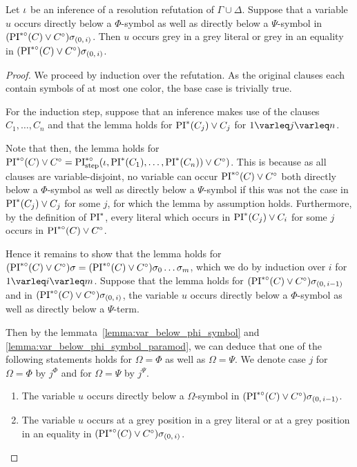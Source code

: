 \documentclass[,%
	draft=false,%
	numbers=noendperiod
	12pt,
	a4paper,
	oneside,%
	openany,
]{memoir}
\newcommand{\inv}{\ensuremath{\PIstarnosigma(C)\lor C\nosigma}}
\newcommand{\invp}{\ensuremath{(\inv)}}
\begin{document}
\begin{lemma}
	\label{lemma:col_change}
	Let $\iota$ be an inference of a resolution refutation of $\Gamma \cup \Delta$.
	Suppose that a variable $u$ occurs directly below a $\Phi$-symbol as well as directly below a $\Psi$-symbol in $\invp\sigmazi$.
	Then $u$ occurs grey in a grey literal or grey in an equality in $\invp\sigmazi$.
\end{lemma}
\begin{proof}
	We proceed by induction over the refutation.
	As the original clauses each contain symbols of at most one color, the base case is trivially true.

	For the induction step, suppose that an inference makes use of the clauses $C_1, \dots, C_n$ and that the lemma holds for $\operatorname{PI}^*(C_j) \lor C_j$ for $1\varleq j \varleq n$. 

	Note that then, the lemma holds for $\inv = \PIstepstarnosigma(\inference, \PI^*(C_1), \dots, \PI^*(C_n)) \lor C\nosigma)$.
	This is because as all clauses are variable-disjoint, no variable can occur $\inv$ both directly below a $\Phi$-symbol as well as directly below a $\Psi$-symbol if this was not the case in $\operatorname{PI}^*(C_j) \lor C_j$ for some $j$, for which the lemma by assumption holds.
	Furthermore, by the definition of $\operatorname{PI}^*$, every literal which occurs in $\operatorname{PI}^*(C_j) \lor C_i$ for some $j$ occurs in $\inv$.

	Hence it remains to show that the lemma holds for $\invp\sigma = \invp\sigma_0\quantifierdots\sigma_m$, which we do by induction over $i$ for $1\varleq i \varleq m$.
	Suppose that the lemma holds for $\invp\sigmazmi$ and in $\invp\sigmazi$, the variable $u$ occurs directly below a $\Phi$-symbol as well as directly below a $\Psi$-term.

	Then by the lemmata~\ref{lemma:var_below_phi_symbol} and \ref{lemma:var_below_phi_symbol_paramod}, we can deduce that one of the following statements holds for $\Omega = \Phi$ as well as $\Omega = \Psi$. We denote case $j$ for $\Omega = \Phi$ by $j^\Phi$ and for $\Omega = \Psi$ by $j^\Psi$.

	\begin{enumerate}
		\item
			\label{16_1}
			The variable $u$ occurs directly below a $\Omega$-symbol in $\invp\sigmazmi$.

		\item
			\label{16_4}
			The variable $u$ occurs at a grey position in a grey literal or at a grey position in an equality in $\invp\sigmazi$.


\end{enumerate}
\end{proof}
\end{document}
